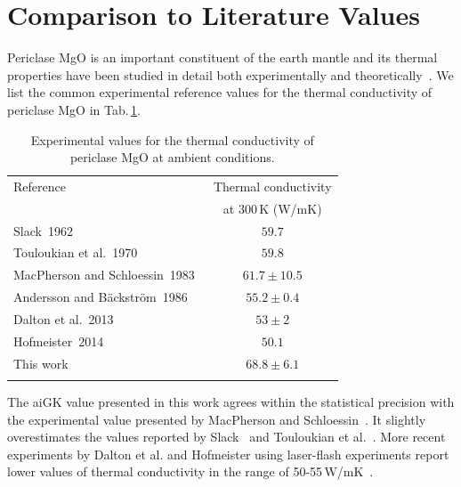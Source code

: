 \section{Comparison to Literature Values}
Periclase MgO is an important constituent of the earth mantle and its thermal properties have been studied in detail both experimentally and theoretically~\cite{charvat1957,slack1962,touloukian1970,Macpherson1983,Koker2009,Stackhouse2010,tang2010,dekura2017}. We list the common experimental reference values for the thermal conductivity of periclase MgO in Tab.\,\ref{tab:exp.MgO}.
\begin{table}[ht]
  \centering
  \selectfont
  \begin{tabular}{lc}
    \toprule
    Reference & Thermal conductivity \\
    & at 300\,K (W/mK) \\
    \midrule
    Slack~1962~\cite{slack1962} & $59.7$ \\
    Touloukian et al.~1970~\cite{touloukian1970} & $59.8$ \\
    MacPherson and Schloessin~1983~\cite{Macpherson1983} & $61.7 \pm 10.5$ \\
    Andersson and B\"ackstr\"om~1986~\cite{andersson1986} & $55.2 \pm 0.4$ \\
    Dalton et al.~2013~\cite{dalton2013} & $53 \pm 2$ \\
    Hofmeister~2014~\cite{hofmeister2014} & $50.1$ \\
    This work & $68.8 \pm 6.1$ \\
    \bottomrule
    \vspace{.5em}
  \end{tabular}
  \caption{Experimental values for the thermal conductivity of periclase MgO at ambient conditions. %
  }
  \label{tab:exp.MgO}
\end{table}
The aiGK value presented in this work agrees within the statistical precision with the experimental value presented by MacPherson and Schloessin~\cite{Macpherson1983}. It slightly overestimates the values reported by Slack~\cite{slack1962} and Touloukian et al.~\cite{touloukian1970}. More recent experiments by Dalton et al. and Hofmeister using laser-flash experiments report lower values of thermal conductivity in the range of 50-55\,W/mK~\cite{dalton2013,hofmeister2014}.

